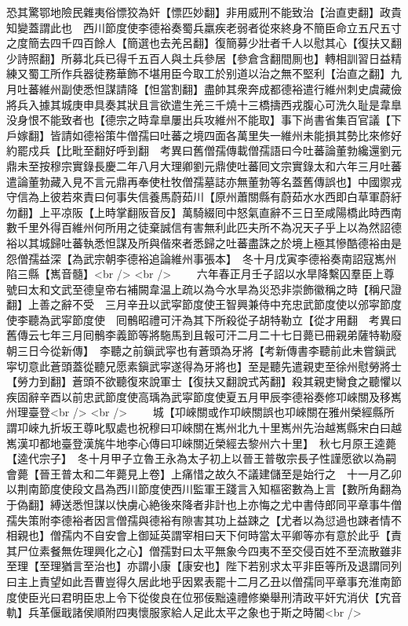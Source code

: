 恐其驚鄂地險民雜夷俗慓狡為奸【慓匹妙翻】非用威刑不能致治【治直吏翻】政貴知變蓋謂此也　西川節度使李德裕奏蜀兵羸疾老弱者從來終身不簡臣命立五尺五寸之度簡去四千四百餘人【簡選也去羌呂翻】復簡募少壯者千人以慰其心【復扶又翻少詩照翻】所募北兵已得千五百人與土兵參居【參倉含翻間厠也】轉相訓習日益精練又蜀工所作兵器徒務華飾不堪用臣今取工於别道以治之無不堅利【治直之翻】九月吐蕃維州副使悉怛謀請降【怛當割翻】盡帥其衆奔成都德裕遣行維州刺史虞藏儉將兵入據其城庚申具奏其狀且言欲遣生羌三千燒十三橋擣西戎腹心可洗久耻是韋臯没身恨不能致者也【德宗之時韋臯屢出兵攻維州不能取】事下尚書省集百官議【下戶嫁翻】皆請如德裕策牛僧孺曰吐蕃之境四面各萬里失一維州未能損其勢比來修好約罷戍兵【比毗至翻好呼到翻　考異曰舊僧孺傳載僧孺語曰今吐蕃論董勃纔還劉元鼎未至按穆宗實錄長慶二年八月大理卿劉元鼎使吐蕃囘文宗實錄太和六年三月吐蕃遣論董勃藏入見不言元鼎再奉使杜牧僧孺墓誌亦無董勃等名蓋舊傳誤也】中國禦戎守信為上彼若來責曰何事失信養馬蔚茹川【原州蕭關縣有蔚茹水水西即白草軍蔚紆勿翻】上平凉阪【上時掌翻阪音反】萬騎綴囘中怒氣直辭不三日至咸陽橋此時西南數千里外得百維州何所用之徒棄誠信有害無利此匹夫所不為况天子乎上以為然詔德裕以其城歸吐蕃執悉怛謀及所與偕來者悉歸之吐蕃盡誅之於境上極其慘酷德裕由是怨僧孺益深【為武宗朝李德裕追論維州事張本】　冬十月戊寅李德裕奏南詔寇嶲州陷三縣【嶲音髓】<br />
<br />
　　六年春正月壬子詔以水旱降繫囚羣臣上尊號曰太和文武至德皇帝右補闕韋温上疏以為今水旱為災恐非崇飾徽稱之時【稱尺證翻】上善之辭不受　三月辛丑以武寜節度使王智興兼侍中充忠武節度使以邠寜節度使李聽為武寜節度使　囘鶻昭禮可汗為其下所殺從子胡特勒立【從才用翻　考異曰舊傳云七年三月囘鶻李義節等將駞馬到且報可汗二月二十七日薨已冊親弟薩特勒廢朝三日今從新傳】　李聽之前鎭武寜也有蒼頭為牙將【考新傳書李聽前此未嘗鎭武寜切意此蒼頭蓋從聽兄愿素鎭武寜遂得為牙將也】至是聽先遣親吏至徐州慰勞將士【勞力到翻】蒼頭不欲聽復來說軍士【復扶又翻說式芮翻】殺其親吏臠食之聽懼以疾固辭辛酉以前忠武節度使高瑀為武寜節度使夏五月甲辰李德裕奏修卭崍關及移嶲州理臺登<br />
<br />
　　城【卭崍關或作卭峽關誤也卭崍關在雅州榮經縣所謂卭崍九折坂王尊叱馭處也祝穆曰卭崍關在嶲州北九十里嶲州先治越嶲縣宋白曰越嶲漢卭都地臺登漢旄牛地李心傳曰卭崍關近榮經去黎州六十里】　秋七月原王逵薨【逵代宗子】　冬十月甲子立魯王永為太子初上以晉王普敬宗長子性謹愿欲以為嗣會薨【晉王普太和二年薨見上卷】上痛惜之故久不議建儲至是始行之　十一月乙卯以荆南節度使段文昌為西川節度使西川監軍王踐言入知樞密數為上言【數所角翻為于偽翻】縛送悉怛謀以快虜心絶後來降者非計也上亦悔之尤中書侍郎同平章事牛僧孺失策附李德裕者因言僧孺與德裕有隙害其功上益踈之【尤者以為愆過也踈者情不相親也】僧孺内不自安會上御延英謂宰相曰天下何時當太平卿等亦有意於此乎【責其尸位素餐無佐理興化之心】僧孺對曰太平無象今四夷不至交侵百姓不至流散雖非至理【至理猶言至治也】亦謂小康【康安也】陛下若别求太平非臣等所及退謂同列曰主上責望如此吾曹豈得久居此地乎因累表罷十二月乙丑以僧孺同平章事充淮南節度使臣光曰君明臣忠上令下從俊良在位邪佞黜遠禮修樂舉刑清政平奸宄消伏【宄音軌】兵革偃戢諸侯順附四夷懷服家給人足此太平之象也于斯之時閽<br />
